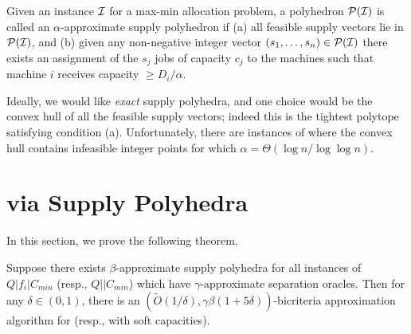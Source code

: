 \begin{definition}\label{def:supp-poly}
	Given an instance ${\cal I}$ for a max-min allocation problem, a polyhedron ${\cal P}({\cal I})$ is called an $\alpha$-approximate supply polyhedron if
	(a) all feasible supply vectors lie in ${\cal P}({\cal I})$, and (b) given any non-negative integer vector $(s_1,\ldots,s_n)\in {\cal P}({\cal I})$ there exists an assignment
	of the $s_j$ jobs of capacity $c_j$ to the machines such that machine $i$ receives capacity $\geq D_i/\alpha$.
\end{definition}

Ideally, we would like {\em exact} supply polyhedra, and one choice would be the convex hull of all the feasible supply vectors; indeed this is the tightest polytope satisfying condition (a).
Unfortunately, there are instances of \cckp where the convex hull contains infeasible integer points for which $\alpha = \Theta(\log n/\log \log n)$.


\section{\mckc via Supply Polyhedra}\label{sec:o1}
\def\yy{y^\calT}
In this section, we prove the following theorem. %
\begin{theorem}\label{thm:reduction}
Suppose there exists $\beta$-approximate supply polyhedra  for all instances of $Q|f_i|C_{min}$ (resp., $Q||C_{min}$) which have $\gamma$-approximate separation oracles.
Then for any $\delta\in(0,1)$, there is an $\left(\tilde{O}(1/\delta),\gamma\beta(1+5\delta)\right)$-bicriteria approximation algorithm for  \mckc (resp., with soft capacities).
\end{theorem}
\noindent
	
